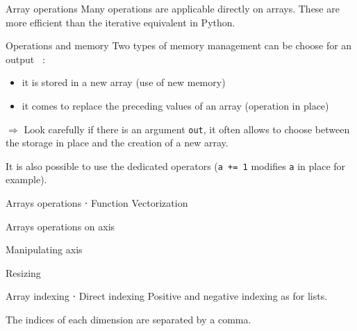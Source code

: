 \begin{frame}{Array operations}
  Many operations are applicable directly on arrays. These are more efficient than the iterative equivalent in Python.
\end{frame}

\begin{frame}{Operations and memory}
  Two types of memory management can be choose for an output ~:
  \begin{itemize}
    \item it is stored in a new array (use of new memory)
    \item it comes to replace the preceding values of an array (operation in place)
  \end{itemize}
  $\Rightarrow$ Look carefully if there is an argument \texttt{out}, it often allows to choose between the storage in place and the creation of a new array.

  It is also possible to use the dedicated operators (\texttt{a += 1} modifies \texttt{a} in place for example).
\end{frame}

\begin{frame}{Arrays operations ⋅ Function Vectorization}
\end{frame}

\begin{frame}{Arrays operations on axis}
\end{frame}

\begin{frame}{Manipulating axis}
\end{frame}

\begin{frame}{Resizing}
\end{frame}

\begin{frame}{Array indexing ⋅ Direct indexing}
  Positive and negative indexing as for lists.

  The indices of each dimension are separated by a comma.

\end{frame}

